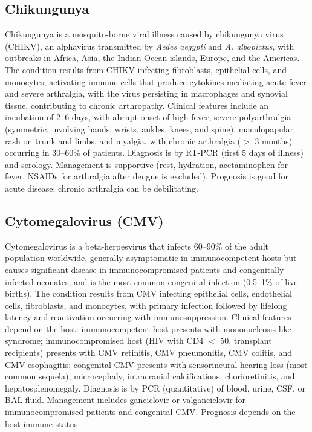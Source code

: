 \subsection{Chikungunya}
\label{sec:Chikungunya}
Chikungunya is a mosquito-borne viral illness caused by chikungunya virus (CHIKV), an alphavirus transmitted by \textit{Aedes aegypti} and \textit{A. albopictus}, with outbreaks in Africa, Asia, the Indian Ocean islands, Europe, and the Americas. The condition results from CHIKV infecting fibroblasts, epithelial cells, and monocytes, activating immune cells that produce cytokines mediating acute fever and severe arthralgia, with the virus persisting in macrophages and synovial tissue, contributing to chronic arthropathy. Clinical features include an incubation of 2--6 days, with abrupt onset of high fever, severe polyarthralgia (symmetric, involving hands, wrists, ankles, knees, and spine), maculopapular rash on trunk and limbs, and myalgia, with chronic arthralgia ($>$ 3 months) occurring in 30--60\% of patients. Diagnosis is by RT-PCR (first 5 days of illness) and serology. Management is supportive (rest, hydration, acetaminophen for fever, NSAIDs for arthralgia after dengue is excluded). Prognosis is good for acute disease; chronic arthralgia can be debilitating.

\subsection{Cytomegalovirus (CMV)}
\label{sec:Cytomegalovirus}
Cytomegalovirus is a beta-herpesvirus that infects 60--90\% of the adult population worldwide, generally asymptomatic in immunocompetent hosts but causes significant disease in immunocompromised patients and congenitally infected neonates, and is the most common congenital infection (0.5--1\% of live births). The condition results from CMV infecting epithelial cells, endothelial cells, fibroblasts, and monocytes, with primary infection followed by lifelong latency and reactivation occurring with immunosuppression. Clinical features depend on the host: immunocompetent host presents with mononucleosis-like syndrome; immunocompromised host (HIV with CD4 $<$ 50, transplant recipients) presents with CMV retinitis, CMV pneumonitis, CMV colitis, and CMV esophagitis; congenital CMV presents with sensorineural hearing loss (most common sequela), microcephaly, intracranial calcifications, chorioretinitis, and hepatosplenomegaly. Diagnosis is by PCR (quantitative) of blood, urine, CSF, or BAL fluid. Management includes ganciclovir or valganciclovir for immunocompromised patients and congenital CMV. Prognosis depends on the host immune status.

